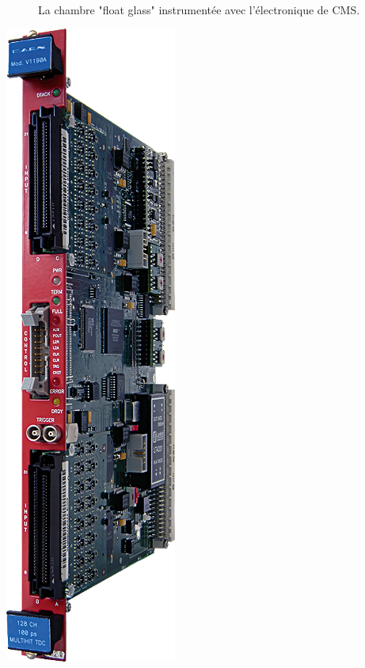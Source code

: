 \begin{figure}[ht]
	 \hfill
	{\,}
	\caption{La chambre "float glass" instrumentée avec l'électronique de CMS.}
	\label{chambrefloat}
\end{figure}
\marginpar
{
	\centering
	\includegraphics[width=0.5\marginparwidth]{GLA/TDC.png}
	\label{TDC}
}

